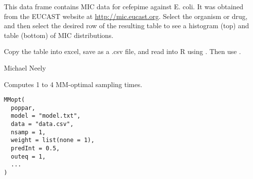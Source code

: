 \documentclass[a4paper]{book}
\begin{document}
%
\begin{Details}\relax
This data frame contains MIC data for cefepime against E. coli.  It was obtained 
from the EUCAST website at \url{http://mic.eucast.org}.  Select the organism
or drug, and then select the desired row of the resulting table to see
a histogram (top) and table (bottom) of MIC distributions.

Copy the table into excel, save as a .csv file, and read into R using
.  Then use .
\end{Details}
%
\begin{Author}\relax
Michael Neely
\end{Author}
%
\begin{Description}\relax
Computes 1 to 4 MM-optimal sampling times.
\end{Description}
%
\begin{Usage}
\begin{verbatim}
MMopt(
  poppar,
  model = "model.txt",
  data = "data.csv",
  nsamp = 1,
  weight = list(none = 1),
  predInt = 0.5,
  outeq = 1,
  ...
)
\end{verbatim}
\end{Usage}
%
\end{document}
